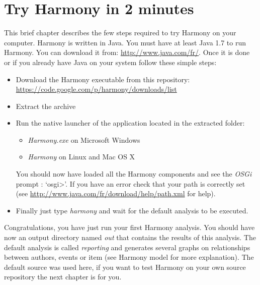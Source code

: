 \chapter{Try Harmony in 2 minutes}\label{chap:TryHarmonyIn2Minutes}

This brief chapter describes the few steps required to try Harmony on your computer. Harmony is written in Java. You must have at least Java 1.7 to run Harmony. You can download it from: \url{http://www.java.com/fr/}. Once it is done or if you already have Java on your system follow these simple steps:
\begin{itemize}
	\item Download the Harmony executable from this repository: \\\url{https://code.google.com/p/harmony/downloads/list}
	\item Extract the archive
	\item Run the native launcher of the application located in the extracted folder:
		\begin{itemize}
			\item \emph{Harmony.exe} on Microsoft Windows
			\item \emph{Harmony} on Linux and Mac OS X
		\end{itemize}
	You should now have loaded all the Harmony components and see the \emph{OSGi} prompt : `osgi>'. If you have an error check that your path is correctly set (see \url{http://www.java.com/fr/download/help/path.xml} for help).	
	\item Finally just type \emph{harmony} and wait for the default analysis to be executed.
\end{itemize}

Congratulations, you have just run your first Harmony analysis. You should have now an output directory named \emph{out} that contains the results of this analysis. The default analysis is called \emph{reporting} and generates several graphs on relationships between authors, events or item (see Harmony model for more explanation). The default source was used here, if you want to test Harmony on your own source repository the next chapter is for you.
	



